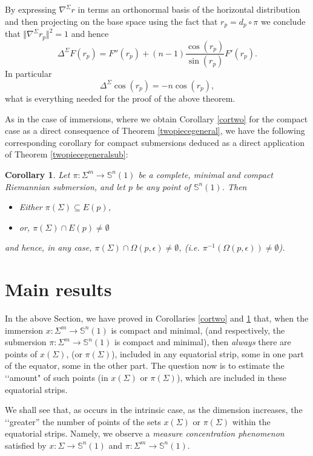 \documentclass[11pt,letterpaper]{amsart}
\newtheorem{corollary}[theorem]{Corollary}
\theoremstyle{definition}
\theoremstyle{remark}
\begin{document}
By expressing $\nabla^\Sigma r$ in terms an orthonormal basis of the horizontal distribution and then projecting on the base space using the fact that $r_p=d_p\circ \pi$ we conclude that $\Vert \nabla^\Sigma r_p\Vert^2=1$ and hence 
\begin{equation}\label{eq:lapsub}
    \Delta^\Sigma F(r_p)=F''(r_p)+(n-1) \frac{\cos(r_p)}{\sin(r_p)} F'(r_p).
\end{equation}
In particular
$$
\Delta^\Sigma \cos(r_p)=-n \cos(r_p),
$$
what is everything needed for the proof of the above theorem. 

As in the case of immersions, where we obtain Corollary \ref{cortwo} for the compact case as a direct consequence of Theorem \ref{twopiecegeneral}, we have the following corresponding corollary for compact submersions deduced as a direct application of Theorem \ref{twopiecegeneralsub}:
\begin{corollary}\label{cortwoSub}
	Let $\pi:\Sigma^m \to \mathbb{S}^n(1)$ be a complete, minimal and compact Riemannian submersion, and let $p$ be any point of $\mathbb{S}^n(1)$.  Then
    \begin{itemize}
        \item Either $\pi(\Sigma)\subseteq E(p)$, 
        \item or, $\pi(\Sigma)\cap E(p)\neq \emptyset$
            \end{itemize}
            and  hence, in any case,  $\pi(\Sigma) \cap \Omega(p,\epsilon) \neq \emptyset$, (i.e. $\pi^{-1}(\Omega(p,\epsilon))\neq \emptyset$).
\end{corollary}
\section{Main results}

In the above Section, we have proved in Corollaries \ref{cortwo} and \ref{cortwoSub} that, when the immersion $x: \Sigma^m \to \mathbb{S}^n(1)$ is  compact and minimal, (and respectively, the submersion $\pi:\Sigma^m \to \mathbb{S}^n(1)$ is compact and minimal), then \emph{always} there are points of $x(\Sigma)$, (or $\pi(\Sigma)$), included in any equatorial strip, some in one part of the equator, some in the other part. The question now is to estimate the \lq\lq amount" of such points (in $x(\Sigma)$ or $\pi(\Sigma)$),  which are included in these equatorial strips. 

We shall see that, as occurs in the intrinsic case, as the dimension increases, the \lq\lq greater'' the number of points of the sets $x(\Sigma)$ or $\pi(\Sigma)$ within the equatorial strips. Namely, we observe a \emph{measure concentration phenomenon} satisfied by $x: \Sigma\to \mathbb{S}^n(1)$ and $\pi:\Sigma^m \to \mathbb{S}^n(1)$.
\end{document}
